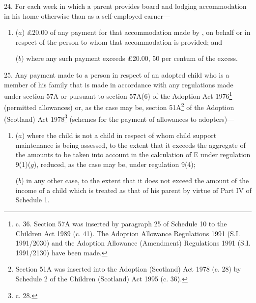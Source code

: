 \documentclass[12pt,a4paper]{article}
\begin{document}

\medskip

24.  
For each week in which a parent provides  %
board and lodging accommodation in his home otherwise than as a self-employed earner—
\begin{enumerate}\item[]
($a$) £20.00 of any payment for that accommodation made by%
, on behalf or in respect of  %
the person to whom that accommodation is provided; and

($b$) where any such payment exceeds £20.00, 50 per centum of the excess.
\end{enumerate}


\medskip

25.  Any payment made to a person in respect of an adopted child who is a member of his family that is made in accordance with any regulations made under section 57A or pursuant to section 57A(6) of the Adoption Act 1976\footnote{ c. 36. Section 57A was inserted by paragraph 25 of Schedule 10 to the Children Act 1989 (c. 41). The Adoption Allowance Regulations 1991 (S.I. 1991/2030) and the Adoption Allowance (Amendment) Regulations 1991 (S.I. 1991/2130) have been made.} (permitted allowances) or, as the case may be, 
section 51A\footnote{\frenchspacing Section 51A was inserted into the Adoption (Scotland) Act 1978 (c. 28) by Schedule 2 of the Children (Scotland) Act 1995 (c. 36).}  %
of the Adoption (Scotland) Act 1978\footnote{ c. 28.} (schemes for the payment of allowances to adopters)—
\begin{enumerate}\item[]
($a$) where the child is not a child in respect of whom child support maintenance is being assessed, to the extent that it exceeds 
the aggregate of the amounts to be taken into account in the calculation of E under regulation 9(1)($g$), %
reduced, as the case may be, under regulation 9(4);

($b$) in any other case, to the extent that it does not exceed the amount of the income of a child which is treated as that of his parent by virtue of Part IV
of Schedule 1.  %
\end{enumerate}
\end{document}
